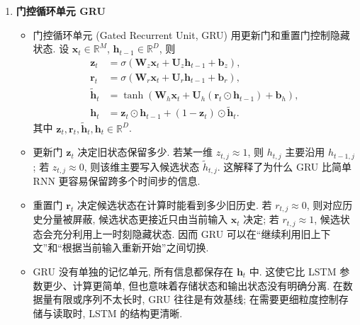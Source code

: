 \documentclass{../nndlcourse}
\begin{document}
\begin{enumerate}
\item \textbf{门控循环单元 GRU}
  \begin{itemize}
    \item 门控循环单元 (Gated Recurrent Unit, GRU) 用更新门和重置门控制隐藏状态. 设 $\boldsymbol{x}_t\in\mathbb{R}^{M}$, $\boldsymbol{h}_{t-1}\in\mathbb{R}^{D}$, 则
    \begin{align*}
      \boldsymbol{z}_t
      &= \sigma\left(\boldsymbol{W}_z\boldsymbol{x}_t
        + \boldsymbol{U}_z\boldsymbol{h}_{t-1}+\boldsymbol{b}_z\right), \\
      \boldsymbol{r}_t
      &= \sigma\left(\boldsymbol{W}_r\boldsymbol{x}_t
        + \boldsymbol{U}_r\boldsymbol{h}_{t-1}+\boldsymbol{b}_r\right), \\
      \tilde{\boldsymbol{h}}_t
      &= \tanh\left(\boldsymbol{W}_h\boldsymbol{x}_t
        + \boldsymbol{U}_h(\boldsymbol{r}_t\odot\boldsymbol{h}_{t-1})
        + \boldsymbol{b}_h\right), \\
      \boldsymbol{h}_t
      &= \boldsymbol{z}_t\odot\boldsymbol{h}_{t-1}
        + (1-\boldsymbol{z}_t)\odot\tilde{\boldsymbol{h}}_t.
    \end{align*}
    其中 $\boldsymbol{z}_t,\boldsymbol{r}_t,\tilde{\boldsymbol{h}}_t,\boldsymbol{h}_t\in\mathbb{R}^{D}$.
    \item 更新门 $\boldsymbol{z}_t$ 决定旧状态保留多少. 若某一维 $z_{t,j}\approx 1$, 则 $h_{t,j}$ 主要沿用 $h_{t-1,j}$; 若 $z_{t,j}\approx 0$, 则该维主要写入候选状态 $\tilde{h}_{t,j}$. 这解释了为什么 GRU 比简单 RNN 更容易保留跨多个时间步的信息.
    \item 重置门 $\boldsymbol{r}_t$ 决定候选状态在计算时能看到多少旧历史. 若 $r_{t,j}\approx 0$, 则对应历史分量被屏蔽, 候选状态更接近只由当前输入 $\boldsymbol{x}_t$ 决定; 若 $r_{t,j}\approx 1$, 候选状态会充分利用上一时刻隐藏状态. 因而 GRU 可以在“继续利用旧上下文”和“根据当前输入重新开始”之间切换.
    \item GRU 没有单独的记忆单元, 所有信息都保存在 $\boldsymbol{h}_t$ 中. 这使它比 LSTM 参数更少、计算更简单, 但也意味着存储状态和输出状态没有明确分离. 在数据量有限或序列不太长时, GRU 往往是有效基线; 在需要更细粒度控制存储与读取时, LSTM 的结构更清晰.
  \end{itemize}


\end{enumerate}
\end{document}
